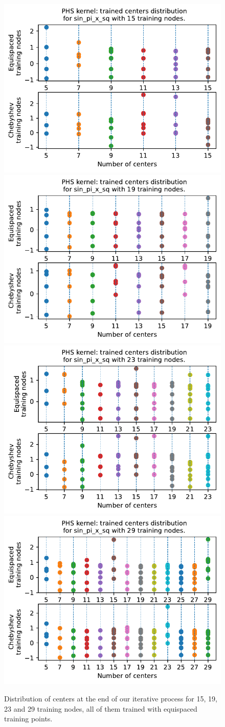 \documentclass[12pt]{report} %
\begin{document}
\begin{figure}[ht]
    \centering
    \includegraphics[width=.45\textwidth, trim={0 4.47cm 0 0}, clip=true]{imagenes/experiments/1d/phs_nodes_asymptotic/sin_pi_x_sq_TR15.pdf}
    \includegraphics[width=.45\textwidth, trim={0 4.47cm 0 0}, clip=true]{imagenes/experiments/1d/phs_nodes_asymptotic/sin_pi_x_sq_TR19.pdf}
    \includegraphics[width=.45\textwidth, trim={0 4.47cm 0 0}, clip=true]{imagenes/experiments/1d/phs_nodes_asymptotic/sin_pi_x_sq_TR23.pdf}
    \includegraphics[width=.45\textwidth, trim={0 4.47cm 0 0}, clip=true]{imagenes/experiments/1d/phs_nodes_asymptotic/sin_pi_x_sq_TR29.pdf}
    \caption{Distribution of centers at the end of our iterative process for 15, 19, 23 and 29 training nodes, all of them trained with equispaced training points.}
    \label{fig:epochs-sin-pi-sq-show}
\end{figure}
\end{document}
